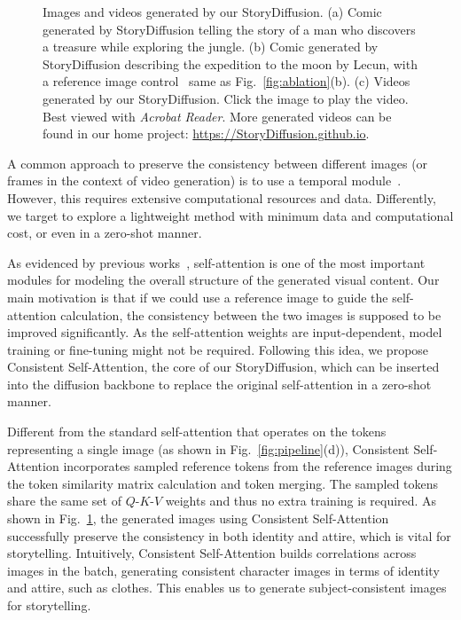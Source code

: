 \documentclass{article} %
\newcommand{\nameofmethod}{StoryDiffusion}
\newcommand{\nameofsa}{Consistent Self-Attention}
\renewcommand{\figref}[1]{Fig.~\ref{#1}}
\begin{document}
\begin{figure}[!t]
\begin{minipage}[t]{0.24\textwidth}
    \end{minipage}
    \begin{minipage}[t]{0.98\textwidth}
    \end{minipage}
    \caption{Images and videos generated by our \nameofmethod{}. (a) Comic generated by \nameofmethod{} telling the story of a man who discovers a treasure while exploring the jungle. (b) Comic generated by \nameofmethod{}  describing the expedition to the moon by Lecun, with a reference image control~\citep{li2023photomaker} same as  \figref{fig:ablation}(b). (c) Videos generated by our \nameofmethod{}. Click the image to play the video. Best viewed with {\it Acrobat Reader}. More generated videos can be found in our home project: \url{https://StoryDiffusion.github.io}.
    } 
    \label{fig:teaser}
\end{figure}

A common approach to preserve the consistency between different images (or frames in the context of video generation) is to use a temporal module~\citep{ho2022video, blattmann2023align}.
%
However, this requires extensive computational resources and data. Differently, we target to explore a lightweight method with minimum data and computational cost, or even in a zero-shot manner.

As evidenced by previous works~\citep{tian2023diffuse,hong2023improving}, self-attention is one of the most important modules for modeling the overall structure of the generated visual content.
%
Our main motivation is that if we could use a reference image 
to guide the self-attention calculation, the consistency between the two images is supposed to be improved significantly.
%
As the self-attention weights are input-dependent, model training or fine-tuning might not be required.  
Following this idea, we propose \nameofsa{}, the core of our \nameofmethod{}, which can be inserted into the diffusion backbone to replace the original self-attention in a zero-shot manner.
%

Different from the standard self-attention that operates on the tokens representing a single image (as shown in \figref{fig:pipeline}(d)), \nameofsa{} 
incorporates sampled reference tokens from the reference images during the token similarity matrix calculation and token merging.
%
The sampled tokens share the same set of $Q$-$K$-$V$ weights and thus no extra training is required. 
%
As shown in \figref{fig:teaser}, the generated images using \nameofsa{} successfully preserve the consistency in both identity and attire, which is vital for storytelling.
%
Intuitively, \nameofsa{} builds correlations across images in the batch, generating consistent character images in terms of identity and attire, such as clothes.
%
This enables us to generate subject-consistent images for storytelling. 
\end{document}
